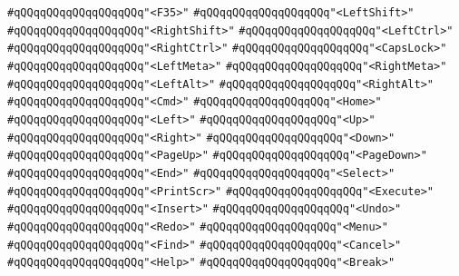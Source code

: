 \verb|#qQQqqQQqqQQqqQQqqQQq"<F35>"|\newline
\verb|#qQQqqQQqqQQqqQQqqQQq"<LeftShift>"|\newline
\verb|#qQQqqQQqqQQqqQQqqQQq"<RightShift>"|\newline
\verb|#qQQqqQQqqQQqqQQqqQQq"<LeftCtrl>"|\newline
\verb|#qQQqqQQqqQQqqQQqqQQq"<RightCtrl>"|\newline
\verb|#qQQqqQQqqQQqqQQqqQQq"<CapsLock>"|\newline
\verb|#qQQqqQQqqQQqqQQqqQQq"<LeftMeta>"|\newline
\verb|#qQQqqQQqqQQqqQQqqQQq"<RightMeta>"|\newline
\verb|#qQQqqQQqqQQqqQQqqQQq"<LeftAlt>"|\newline
\verb|#qQQqqQQqqQQqqQQqqQQq"<RightAlt>"|\newline
\verb|#qQQqqQQqqQQqqQQqqQQq"<Cmd>"|\newline
\verb|#qQQqqQQqqQQqqQQqqQQq"<Home>"|\newline
\verb|#qQQqqQQqqQQqqQQqqQQq"<Left>"|\newline
\verb|#qQQqqQQqqQQqqQQqqQQq"<Up>"|\newline
\verb|#qQQqqQQqqQQqqQQqqQQq"<Right>"|\newline
\verb|#qQQqqQQqqQQqqQQqqQQq"<Down>"|\newline
\verb|#qQQqqQQqqQQqqQQqqQQq"<PageUp>"|\newline
\verb|#qQQqqQQqqQQqqQQqqQQq"<PageDown>"|\newline
\verb|#qQQqqQQqqQQqqQQqqQQq"<End>"|\newline
\verb|#qQQqqQQqqQQqqQQqqQQq"<Select>"|\newline
\verb|#qQQqqQQqqQQqqQQqqQQq"<PrintScr>"|\newline
\verb|#qQQqqQQqqQQqqQQqqQQq"<Execute>"|\newline
\verb|#qQQqqQQqqQQqqQQqqQQq"<Insert>"|\newline
\verb|#qQQqqQQqqQQqqQQqqQQq"<Undo>"|\newline
\verb|#qQQqqQQqqQQqqQQqqQQq"<Redo>"|\newline
\verb|#qQQqqQQqqQQqqQQqqQQq"<Menu>"|\newline
\verb|#qQQqqQQqqQQqqQQqqQQq"<Find>"|\newline
\verb|#qQQqqQQqqQQqqQQqqQQq"<Cancel>"|\newline
\verb|#qQQqqQQqqQQqqQQqqQQq"<Help>"|\newline
\verb|#qQQqqQQqqQQqqQQqqQQq"<Break>"|\newline
